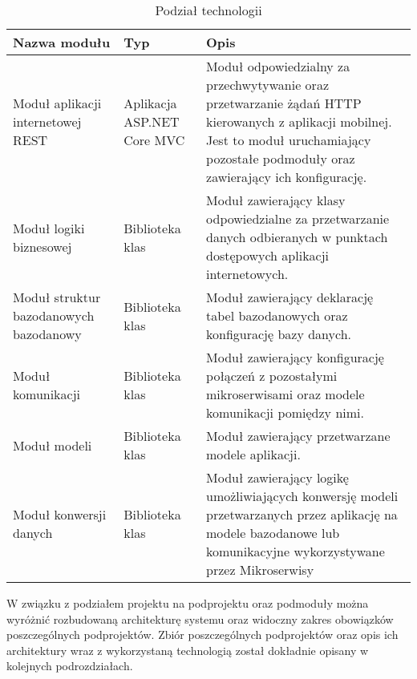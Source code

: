 {\begin{table}[htbp]
	\caption{Podział technologii}
	\label{project-architecture}
	\begin{center}
		\begin{tabular}{ | p{3cm}| p{3cm} | p{6cm} |}
			\hline Nazwa modułu & Typ &  Opis \\ \hline   
			
			\hline  Moduł aplikacji internetowej REST \cite{REST} &  Aplikacja ASP.NET Core MVC & Moduł odpowiedzialny za przechwytywanie oraz przetwarzanie żądań HTTP kierowanych z aplikacji mobilnej. Jest to moduł uruchamiający pozostałe podmoduły oraz zawierający ich konfigurację.\\ \hline
			
			\hline  Moduł logiki biznesowej & Biblioteka klas & Moduł zawierający klasy odpowiedzialne za przetwarzanie danych odbieranych w punktach dostępowych aplikacji internetowych. \\ \hline
			
			\hline Moduł struktur bazodanowych  \mbox{bazodanowy} & Biblioteka klas & Moduł zawierający deklarację tabel bazodanowych oraz konfigurację bazy danych.\\ \hline
			
			\hline Moduł komunikacji & Biblioteka klas & Moduł zawierający konfigurację połączeń z pozostałymi mikroserwisami oraz modele komunikacji pomiędzy nimi.\\ \hline
			
			\hline Moduł modeli & Biblioteka klas & Moduł zawierający przetwarzane modele aplikacji.\\ \hline
			
			
			\hline Moduł konwersji danych & Biblioteka klas & Moduł zawierający logikę umożliwiających konwersję modeli przetwarzanych przez aplikację na modele bazodanowe lub komunikacyjne wykorzystywane przez Mikroserwisy\\ \hline

		\end{tabular}
	\end{center}
\end{table}	

W związku z podziałem projektu na podprojektu oraz podmoduły można wyróżnić rozbudowaną architekturę systemu oraz widoczny zakres obowiązków poszczególnych podprojektów. Zbiór poszczególnych podprojektów oraz opis ich architektury wraz z wykorzystaną technologią został dokładnie opisany w kolejnych podrozdziałach.}



